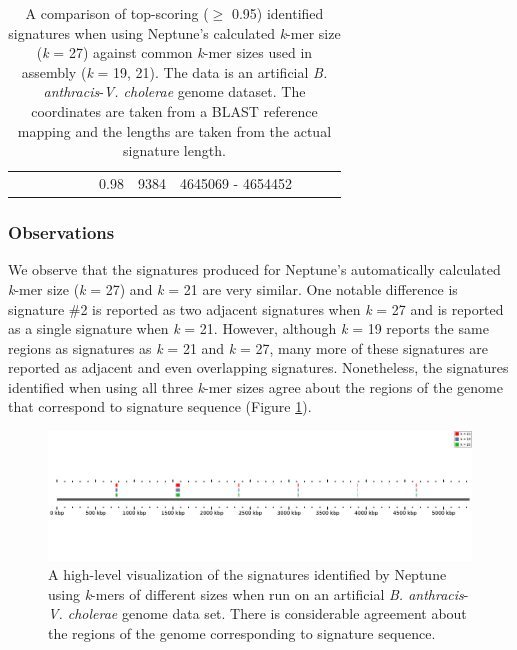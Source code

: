 \documentclass[a4paper,10pt]{article}
\begin{document}
\begin{landscape}
\begin{table}[!h]
\begin{tabular}{| c | c c | c c c | c c c | c c c |}
  & & & & & & 0.98 & 9384 & 4645069 - 4654452 & & & \\ \cline{1-12}
\end{tabular}%
\caption{A comparison of top-scoring (\(\geq\) 0.95) identified signatures when using Neptune's calculated \textit{k}-mer size (\textit{k} = 27) against common \textit{k}-mer sizes used in assembly (\textit{k} = 19, 21). The data is an artificial \textit{B. anthracis}-\textit{V. cholerae} genome dataset. The coordinates are taken from a BLAST reference mapping and the lengths are taken from the actual signature length.}
\label{table:insilico_kmers}
\end{table}
\vfill
\end{landscape}

\subsubsection*{Observations}

We observe that the signatures produced for Neptune's automatically calculated \textit{k}-mer size (\textit{k} = 27) and \textit{k} = 21 are very similar. One notable difference is signature \#2 is reported as two adjacent signatures when \textit{k} = 27 and is reported as a single signature when \textit{k} = 21. However, although \textit{k} = 19 reports the same regions as signatures as \textit{k} = 21 and \textit{k} = 27, many more of these signatures are reported as adjacent and even overlapping signatures. Nonetheless, the signatures identified when using all three \textit{k}-mer sizes agree about the regions of the genome that correspond to signature sequence (Figure \ref{figure:insilico_kmers}).

\begin{figure}
\centering
\includegraphics[width=1.0\textwidth]{insilico_kmers_crop.png}
\caption{A high-level visualization of the signatures identified by Neptune using \textit{k}-mers of different sizes when run on an artificial \textit{B. anthracis}-\textit{V. cholerae} genome data set. There is considerable agreement about the regions of the genome corresponding to signature sequence.}
\label{figure:insilico_kmers}
\end{figure}
\end{document}

